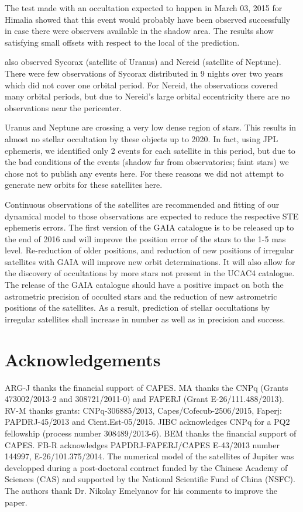 \documentclass[useAMS,usenatbib]{mn2e}
\begin{document}
The test made with an occultation expected to happen in March 03, 2015 for Himalia showed that this event would probably have been observed successfully in case there were observers available in the shadow area. The results show satisfying small offsets with respect to the local of the prediction.

 also observed Sycorax (satellite of Uranus) and Nereid (satellite of Neptune). There were few observations of Sycorax distributed in 9 nights over two years which did not cover one orbital period. For Nereid, the observations covered many orbital periods, but due to Nereid's large orbital eccentricity there are no observations near the pericenter.

Uranus and Neptune are crossing a very low dense region of stars. This results in almost no stellar occultation by these objects up to 2020. In fact, using JPL ephemeris, we identified only 2 events for each satellite in this period, but due to the bad conditions of the events (shadow far from observatories; faint stars) we chose not to publish any events here.  For these reasons we did not attempt to generate new orbits for these satellites here.

Continuous observations of the satellites are recommended and fitting of our dynamical model to those observations are expected to reduce the respective STE ephemeris errors. The first version of the GAIA catalogue is to be released up to the end of 2016 and will improve the position error of the stars to the 1-5 mas level. Re-reduction of older positions, and reduction of new positions of irregular satellites with GAIA will improve new orbit determinations. It will also allow for the discovery of occultations by more stars not present in the UCAC4 catalogue.
The release of the GAIA catalogue should have a positive impact on both the astrometric precision of occulted stars and the reduction of new astrometric positions of the satellites. As a result, prediction of stellar occultations by irregular satellites shall increase in number as well as in precision and success.

\section*{Acknowledgements}

ARG-J thanks the financial support of CAPES.
MA thanks the CNPq (Grants 473002/2013-2 and 308721/2011-0) and FAPERJ (Grant E-26/111.488/2013).
RV-M thanks grants: CNPq-306885/2013, Capes/Cofecub-2506/2015, Faperj: PAPDRJ-45/2013 and Cient.Est-05/2015.
JIBC acknowledges CNPq for a PQ2 fellowship (process number 308489/2013-6).
BEM thanks the financial support of CAPES.
FB-R acknowledges PAPDRJ-FAPERJ/CAPES E-43/2013 number 144997, E-26/101.375/2014.
The numerical model of the satellites of Jupiter was developped during a post-doctoral contract funded by the Chinese Academy of Sciences (CAS) and supported by the National Scientific Fund of China (NSFC).
The authors thank Dr. Nikolay Emelyanov for his comments to improve the paper.






\label{lastpage}
\end{document}
